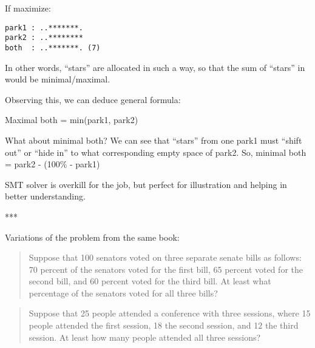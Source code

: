 If maximize:

\begin{lstlisting}
park1 : ..*******.
park2 : ..********
both  : ..*******. (7)
\end{lstlisting}

In other words, ``stars'' are allocated in such a way, so that the sum of ``stars'' in  would be minimal/maximal.

Observing this, we can deduce general formula:

Maximal both = min(park1, park2)

What about minimal both?
We can see that ``stars'' from one park1 must ``shift out'' or ``hide in'' to what corresponding empty space of park2.
So, minimal both = park2 - (100\% - park1)

SMT solver is overkill for the job, but perfect for illustration and helping in better understanding.

***

Variations of the problem from the same book:

\begin{framed}
\begin{quotation}

Suppose that 100 senators voted on three separate senate bills as follows:
70 percent of the senators voted for the first bill, 65 percent voted for the second bill,
and 60 percent voted for the third bill. At least what percentage of the senators voted for all three bills?

\end{quotation}
\end{framed}

\begin{framed}
\begin{quotation}

Suppose that 25 people attended a conference with three sessions, where 15 people attended the first session, 
18 the second session, and 12 the third session. At least how many people attended all three sessions?

\end{quotation}
\end{framed}

